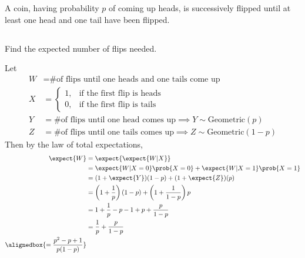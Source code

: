 \documentclass[hwnumber=5,studentnumber=20053722]{mthe353answer}
\begin{document}
  \begin{questions}
    \setcounter{question}{0}
    \question{}
    A coin, having probability \(p\)  of coming up heads, is successively flipped
    until at least one head and one tail have been flipped.
    \begin{parts}
      \part{}
      Find the expected number of flips needed.
      \begin{solution}
        Let
        \begin{align*}
          W &= \text{\# of flips until one heads and one tails come up}\\
          X &= \begin{cases}
            1, & \text{if the first flip is heads}\\
            0, & \text{if the first flip is tails}
          \end{cases}\\
          Y &= \text{\# of flips until one head comes up} \implies
            Y \sim \text{Geometric}(p)\\
          Z &= \text{\# of flips until one tails comes up} \implies
            Z \sim \text{Geometric}(1-p)
        \end{align*}
        Then by the law of total expectations,
        \begin{align*}
          \expect{W} &= \expect{\expect{W | X}}\\
          &= \expect{W|X=0}\prob{X=0} + \expect{W|X=1}\prob{X=1}\\
          &= (1 + \expect{Y})(1-p) + (1 + \expect{Z})(p)\\
          &= \left(1 + \frac{1}{p}\right)(1-p) + \left(1+\frac{1}{1-p}\right)p\\
          &= 1 + \frac{1}{p} -p -1 + p + \frac{p}{1-p}\\
          &= \frac{1}{p} + \frac{p}{1-p}\\
          \alignedbox{= \frac{p^2 - p + 1}{p(1-p)}}
        \end{align*}
      \end{solution}

\end{parts}
\end{questions}
\end{document}
